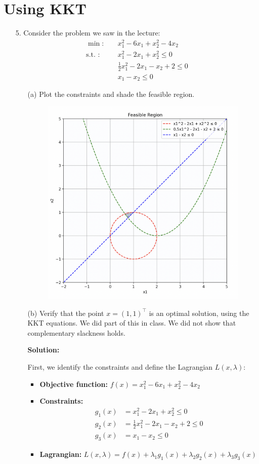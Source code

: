 \documentclass{article}
\begin{document}
\section{Using KKT}

\begin{enumerate}
\item[5.] Consider the problem we saw in the lecture:
    \begin{align*}
    \min : &\quad x_1^2 - 6x_1 + x_2^2 - 4x_2 \\
    \text{s.t. : } &\quad x_1^2 - 2x_1 + x_2^2 \leq 0 \\
    &\quad \frac{1}{2}x_1^2 - 2x_1 - x_2 + 2 \leq 0 \\
    &\quad x_1 - x_2 \leq 0
    \end{align*}

    \begin{enumerate}
    \item[(a)] Plot the constraints and shade the feasible region.

    \begin{figure}[htbp]
        \centering
        \includegraphics[width=0.39\linewidth]{graph.png}
        \label{fig:constraints}
    \end{figure}

    \item[(b)] Verify that the point $x = (1, 1)^\top$ is an optimal solution, using the KKT equations. We did part of this in class. We did not show that complementary slackness holds.
    
    \textbf{Solution:}
    
    First, we identify the constraints and define the Lagrangian $L(x, \lambda)$:
    
    \begin{itemize}
    \item \textbf{Objective function:} $f(x) = x_1^2 - 6x_1 + x_2^2 - 4x_2$
    \item \textbf{Constraints:}
    \begin{align*}
    g_1(x) &= x_1^2 - 2x_1 + x_2^2 \leq 0 \\
    g_2(x) &= \frac{1}{2}x_1^2 - 2x_1 - x_2 + 2 \leq 0 \\
    g_3(x) &= x_1 - x_2 \leq 0
    \end{align*}
    \item \textbf{Lagrangian:} $L(x, \lambda) = f(x) + \lambda_1 g_1(x) + \lambda_2 g_2(x) + \lambda_3 g_3(x)$
    \end{itemize}
    

\end{enumerate}
\end{enumerate}
\end{document}
